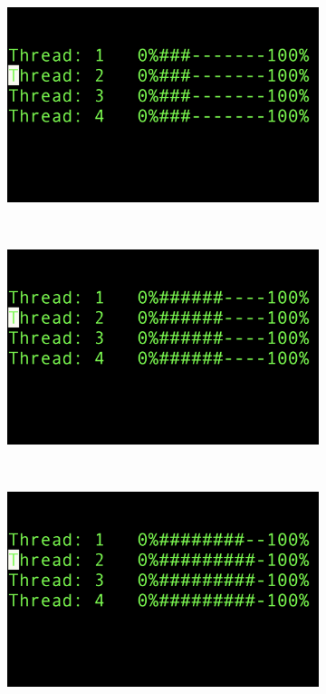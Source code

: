 \begin{figure}[H]
    \centering
    \begin{subfigure}{0.19\textwidth}
        \centering
        \includegraphics[width=1.11\linewidth]{method/bilder/2}
    \end{subfigure}
    ~ 
    \begin{subfigure}{0.19\textwidth}
        \centering
        \includegraphics[width=1.11\linewidth]{method/bilder/3}
    \end{subfigure}
    ~ 
    \begin{subfigure}{0.19\textwidth}
        \centering
        \includegraphics[width=1.11\linewidth]{method/bilder/4}

\end{subfigure}
\end{figure}
